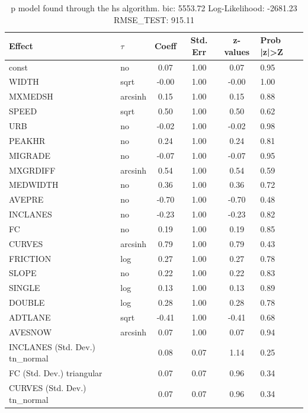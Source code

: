 \begin{table}
	\caption{p model found through the hs algorithm. bic: 5553.72 Log-Likelihood: -2681.23 RMSE_TEST: 915.11}
	\begin{center}
		\begin{tabular}{|l|l|c|c|c|l|}
			\hline
			Effect & $\tau$ & Coeff & Std. Err & z-values & Prob |z|>Z \\
			\hline
			const & no & 0.07 & 1.00 & 0.07 & 0.95 \\
			\hline
			WIDTH & sqrt & -0.00 & 1.00 & -0.00 & 1.00 \\
			\hline
			MXMEDSH & arcsinh & 0.15 & 1.00 & 0.15 & 0.88 \\
			\hline
			SPEED & sqrt & 0.50 & 1.00 & 0.50 & 0.62 \\
			\hline
			URB & no & -0.02 & 1.00 & -0.02 & 0.98 \\
			\hline
			PEAKHR & no & 0.24 & 1.00 & 0.24 & 0.81 \\
			\hline
			MIGRADE & no & -0.07 & 1.00 & -0.07 & 0.95 \\
			\hline
			MXGRDIFF & arcsinh & 0.54 & 1.00 & 0.54 & 0.59 \\
			\hline
			MEDWIDTH & no & 0.36 & 1.00 & 0.36 & 0.72 \\
			\hline
			AVEPRE & no & -0.70 & 1.00 & -0.70 & 0.48 \\
			\hline
			INCLANES & no & -0.23 & 1.00 & -0.23 & 0.82 \\
			\hline
			FC & no & 0.19 & 1.00 & 0.19 & 0.85 \\
			\hline
			CURVES & arcsinh & 0.79 & 1.00 & 0.79 & 0.43 \\
			\hline
			FRICTION & log & 0.27 & 1.00 & 0.27 & 0.78 \\
			\hline
			SLOPE & no & 0.22 & 1.00 & 0.22 & 0.83 \\
			\hline
			SINGLE & log & 0.13 & 1.00 & 0.13 & 0.89 \\
			\hline
			DOUBLE & log & 0.28 & 1.00 & 0.28 & 0.78 \\
			\hline
			ADTLANE & sqrt & -0.41 & 1.00 & -0.41 & 0.68 \\
			\hline
			AVESNOW & arcsinh & 0.07 & 1.00 & 0.07 & 0.94 \\
			\hline
			INCLANES (Std. Dev.) tn_normal &  & 0.08 & 0.07 & 1.14 & 0.25 \\
			\hline
			FC (Std. Dev.) triangular &  & 0.07 & 0.07 & 0.96 & 0.34 \\
			\hline
			CURVES (Std. Dev.) tn_normal &  & 0.07 & 0.07 & 0.96 & 0.34 \\

\end{tabular}
\end{center}
\end{table}

